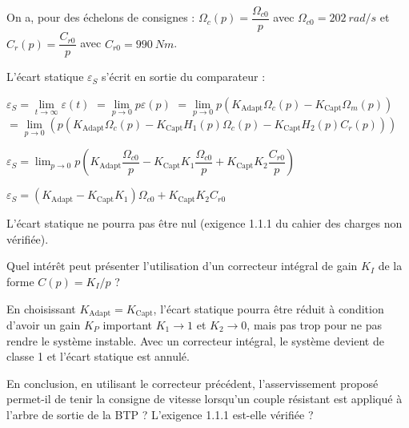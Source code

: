 \ifprof
\begin{corrige}

On a, pour des échelons de consignes :
$\Omega_c (p)=\dfrac{\Omega_{c0}}{p}$	avec $\Omega_{c0}=\SI{202}{rad/s}$	et	$C_r (p)=\dfrac{C_{r0}}{p}$	avec $C_{r0}=\SI{990}{N m}$.

L’écart statique $\varepsilon_S$  s’écrit en sortie du comparateur :

$\varepsilon_S= \lim\limits_{t\to \infty} \varepsilon(t)$  
$=\lim\limits_{p\to 0} p \varepsilon(p)$
$=\lim\limits_{p\to0} p (K_{\text{Adapt}}\Omega_c (p)-K_{\text{Capt}} \Omega_m (p))$
$=\lim\limits_{p\to 0}  \left(p (K_{\text{Adapt}} \Omega_c (p)-K_{\text{Capt}} H_1 (p) \Omega_c (p)-K_{\text{Capt}} H_2 (p) C_r (p))\right)$

$\varepsilon_S=\lim_{p\to 0}  p \left(K_{\text{Adapt}} \dfrac{\Omega_{c0}}{p}-K_{\text{Capt}} K_1 \dfrac{\Omega_{c0}}{p}+K_{\text{Capt}} K_2 \dfrac{C_{r0}}{p}\right)$

$\varepsilon_S=\left(K_{\text{Adapt}}-K_{\text{Capt}} K_1 \right)\Omega_{c0}+ K_{\text{Capt}} K_2C_{r0}$

L’écart statique ne pourra pas être nul (exigence 1.1.1 du cahier des charges non vérifiée).


\end{corrige}
\else
\fi


\begin{question}
Quel intérêt peut présenter l'utilisation d'un correcteur intégral de gain $K_I$ de la forme $C(p)=K_I/p$ ?
\end{question}

\ifprof
\begin{corrige}
En choisissant $K_{\text{Adapt}}=K_{\text{Capt}}$, l’écart statique pourra être réduit à condition d’avoir un gain $K_P$ important $K_1\to 1$ et $K_2\to 0$, mais pas trop pour ne pas rendre le système instable.
Avec un correcteur intégral, le système devient de classe 1 et l’écart statique est annulé.
\end{corrige}
\else
\fi


\begin{question}
En conclusion, en utilisant le correcteur précédent, l'asservissement proposé permet-il de tenir la consigne de vitesse lorsqu'un couple résistant est appliqué à l'arbre de sortie de la BTP ? L'exigence 1.1.1 est-elle vérifiée ?
\end{question}


